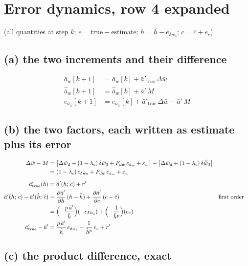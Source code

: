 \documentclass[11pt,a4paper,fontset=none]{ctexart}
\newcommand{\ba}{\bar{a}}
\newcommand{\bw}{\bar{w}}
\newcommand{\dW}{\Delta\bw}
\newcommand{\ap}{\ba'}
\newcommand{\ah}{\hat{\ba}_w}
\newcommand{\hh}{\hat{h}}
\newcommand{\ch}{\hat{c}}
\begin{document}
\newpage
\section{Error dynamics, row 4 expanded}

(all quantities at step $k$; $e = \text{true} - \text{estimate}$; $h = \hh - e_{\delta\bw_3}$; $c = \ch + e_c$)

\subsection*{(a) the two increments and their difference}

\begin{align*}
\ba_w[k+1]                    &= \ba_w[k] + \ap_{\mathrm{true}}\,\dW \\
\ah[k+1]                      &= \ah[k]   + \ap\,M \\
e_{\ba_w}[k+1]                &= e_{\ba_w}[k] + \ap_{\mathrm{true}}\,\dW - \ap\,M
\end{align*}

\subsection*{(b) the two factors, each written as estimate plus its error}

\begin{align*}
\dW - M                       &= \bigl[\Delta\bw_d + (1-\lambda_c)\,\delta\bw_3 + F_{dw}\,e_{\ba_w} + \varepsilon_w\bigr]
                                 - \bigl[\Delta\bw_d + (1-\lambda_c)\,\delta\hat{\bw}_3\bigr] \\
                              &= (1-\lambda_c)\,e_{\delta\bw_3} + F_{dw}\,e_{\ba_w} + \varepsilon_w \\[6pt]
\ap_{\mathrm{true}}(h)        &= \ap(h;\,c) + r' \\
\ap(h;\,c) - \ap(\hh;\,\ch)   &= \frac{\partial\ap}{\partial h}\,(h - \hh) + \frac{\partial\ap}{\partial c}\,(c - \ch)
                                 && \text{first order} \\
                              &= \Bigl(-\frac{p\,\ap}{\hh}\Bigr)(-e_{\delta\bw_3}) + \Bigl(-\frac{1}{\hh^{p}}\Bigr)(e_c) \\
\ap_{\mathrm{true}} - \ap     &= \frac{p\,\ap}{\hh}\,e_{\delta\bw_3} - \frac{1}{\hh^{p}}\,e_c + r'
\end{align*}

\subsection*{(c) the product difference, exact}
\end{document}

